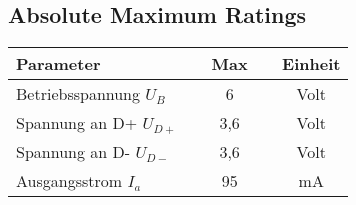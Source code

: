 \subsection{Absolute Maximum Ratings}
\begin{center}
\begin{tabular}{l|c|c}
\hline
\textbf{Parameter} & \textbf{~~Max~~} & \textbf{Einheit} \\
\hline
Betriebsspannung $U_{B}$ & 6 & Volt \\
Spannung an D+ $U_{D+}$ & 3,6 & Volt \\
Spannung an D- $U_{D-}$ & 3,6 & Volt \\
\hline
Ausgangsstrom $I_{a}$ & 95 & mA \\
\end{tabular}
\end{center}

